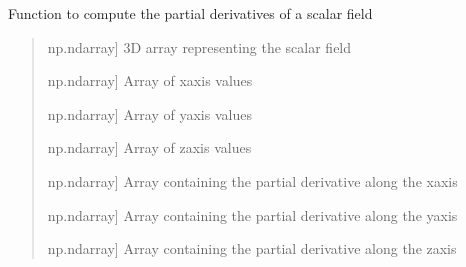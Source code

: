 \documentclass[letterpaper,10pt,english]{sphinxmanual}
\begin{document}
\begin{fulllineitems}
\label{\detokenize{CoolDwarf.utils.math:CoolDwarf.utils.math.calc.compute_partial_derivatives}}
\pysigstartsignatures
{}
\pysigstopsignatures
\sphinxAtStartPar
Function to compute the partial derivatives of a scalar field
\begin{quote}\begin{description}
\begin{description}
\sphinxlineitem{\sphinxstylestrong{scalar\_field}}{[}np.ndarray{]}
\sphinxAtStartPar
3D array representing the scalar field

\sphinxlineitem{\sphinxstylestrong{x}}{[}np.ndarray{]}
\sphinxAtStartPar
Array of x\sphinxhyphen{}axis values

\sphinxlineitem{\sphinxstylestrong{y}}{[}np.ndarray{]}
\sphinxAtStartPar
Array of y\sphinxhyphen{}axis values

\sphinxlineitem{\sphinxstylestrong{z}}{[}np.ndarray{]}
\sphinxAtStartPar
Array of z\sphinxhyphen{}axis values

\end{description}

\begin{description}
\sphinxlineitem{\sphinxstylestrong{dfdx}}{[}np.ndarray{]}
\sphinxAtStartPar
Array containing the partial derivative along the x\sphinxhyphen{}axis

\sphinxlineitem{\sphinxstylestrong{dfdy}}{[}np.ndarray{]}
\sphinxAtStartPar
Array containing the partial derivative along the y\sphinxhyphen{}axis

\sphinxlineitem{\sphinxstylestrong{dfdz}}{[}np.ndarray{]}
\sphinxAtStartPar
Array containing the partial derivative along the z\sphinxhyphen{}axis

\end{description}

\end{description}\end{quote}

\end{fulllineitems}
\end{document}
